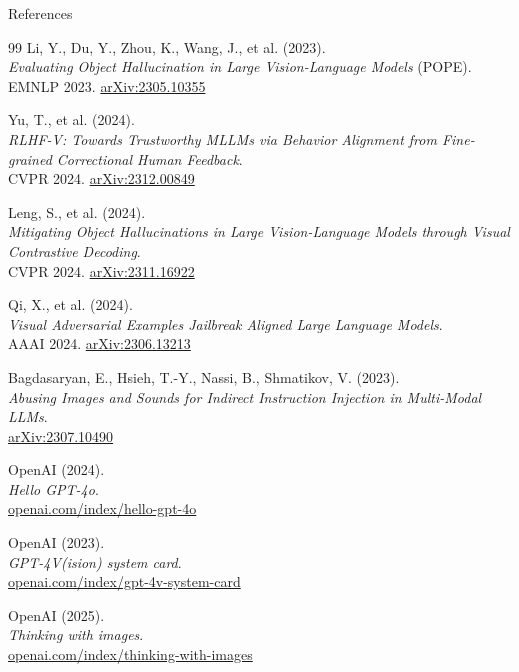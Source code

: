 \begin{frame}[allowframebreaks]{References}
\begin{thebibliography}{99}
      Li, Y., Du, Y., Zhou, K., Wang, J., et al. (2023). \\
      \emph{Evaluating Object Hallucination in Large Vision-Language Models} (POPE).\\
      EMNLP 2023. \href{https://arxiv.org/abs/2305.10355}{arXiv:2305.10355}

      Yu, T., et al. (2024). \\
      \emph{RLHF-V: Towards Trustworthy MLLMs via Behavior Alignment from Fine-grained Correctional Human Feedback}.\\
      CVPR 2024. \href{https://arxiv.org/abs/2312.00849}{arXiv:2312.00849}

      Leng, S., et al. (2024). \\
      \emph{Mitigating Object Hallucinations in Large Vision-Language Models through Visual Contrastive Decoding}.\\
      CVPR 2024. \href{https://arxiv.org/abs/2311.16922}{arXiv:2311.16922}

      Qi, X., et al. (2024). \\
      \emph{Visual Adversarial Examples Jailbreak Aligned Large Language Models}.\\
      AAAI 2024. \href{https://arxiv.org/abs/2306.13213}{arXiv:2306.13213}

      Bagdasaryan, E., Hsieh, T.-Y., Nassi, B., Shmatikov, V. (2023). \\
      \emph{Abusing Images and Sounds for Indirect Instruction Injection in Multi-Modal LLMs}.\\
      \href{https://arxiv.org/abs/2307.10490}{arXiv:2307.10490}

      OpenAI (2024). \\
      \emph{Hello GPT-4o}.\\
      \href{https://openai.com/index/hello-gpt-4o/}{openai.com/index/hello-gpt-4o}

      OpenAI (2023). \\
      \emph{GPT-4V(ision) system card}.\\
      \href{https://openai.com/index/gpt-4v-system-card/}{openai.com/index/gpt-4v-system-card}

      OpenAI (2025). \\
      \emph{Thinking with images}.\\
      \href{https://openai.com/index/thinking-with-images/}{openai.com/index/thinking-with-images}


\end{thebibliography}
\end{frame}

